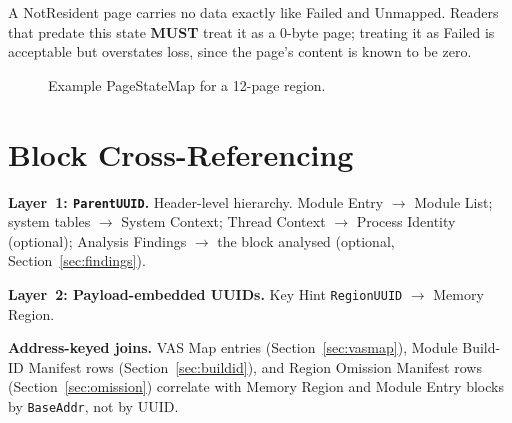 \documentclass[11pt,a4paper]{article}
\newcommand{\MUST}{\textbf{MUST}}
\newcommand{\field}[1]{\texttt{#1}}
\begin{document}
\noindent A NotResident page carries no data exactly like Failed and Unmapped. Readers that predate this state \MUST{} treat it as a 0-byte page; treating it as Failed is acceptable but overstates loss, since the page's content is known to be zero.

\begin{figure}[H]\centering
{}\caption{Example PageStateMap for a 12-page region.}\label{fig:pagestatemap}\end{figure}

\section{Block Cross-Referencing}\label{sec:crossref}
\textbf{Layer~1: \field{ParentUUID}.} Header-level hierarchy. Module Entry $\to$ Module List; system tables $\to$ System Context; Thread Context $\to$ Process Identity (optional); Analysis Findings $\to$ the block analysed (optional, Section~\ref{sec:findings}).

\textbf{Layer~2: Payload-embedded UUIDs.} Key Hint \field{RegionUUID} $\to$ Memory Region.

\textbf{Address-keyed joins.} VAS Map entries (Section~\ref{sec:vasmap}), Module Build-ID Manifest rows (Section~\ref{sec:buildid}), and Region Omission Manifest rows (Section~\ref{sec:omission}) correlate with Memory Region and Module Entry blocks by \field{BaseAddr}, not by UUID.
\end{document}
